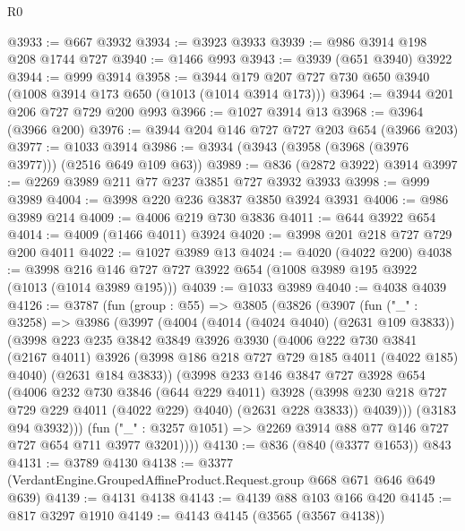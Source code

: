 \begin{lexlean}{R0}
\begin{coremodule}
@3933 := @667 @3932
@3934 := @3923 @3933
@3939 := @986 @3914 @198 @208 @1744 @727
@3940 := @1466 @993
@3943 := @3939 (@651 @3940) @3922
@3944 := @999 @3914
@3958 := @3944 @179 @207 @727 @730 @650 @3940 (@1008 @3914 @173 @650 (@1013 (@1014 @3914 @173)))
@3964 := @3944 @201 @206 @727 @729 @200 @993
@3966 := @1027 @3914 @13
@3968 := @3964 (@3966 @200)
@3976 := @3944 @204 @146 @727 @727 @203 @654 (@3966 @203)
@3977 := @1033 @3914
@3986 := @3934 (@3943 (@3958 (@3968 (@3976 @3977))) (@2516 @649 @109 @63))
@3989 := @836 (@2872 @3922) @3914
@3997 := @2269 @3989 @211 @77 @237 @3851 @727 @3932 @3933
@3998 := @999 @3989
@4004 := @3998 @220 @236 @3837 @3850 @3924 @3931
@4006 := @986 @3989 @214
@4009 := @4006 @219 @730 @3836
@4011 := @644 @3922 @654
@4014 := @4009 (@1466 @4011) @3924
@4020 := @3998 @201 @218 @727 @729 @200 @4011
@4022 := @1027 @3989 @13
@4024 := @4020 (@4022 @200)
@4038 := @3998 @216 @146 @727 @727 @3922 @654 (@1008 @3989 @195 @3922 (@1013 (@1014 @3989 @195)))
@4039 := @1033 @3989
@4040 := @4038 @4039
@4126 := @3787
    (fun (group : @55) =>
    @3805
      (@3826
        (@3907
          (fun ("_" : @3258) =>
          @3986
            (@3997
              (@4004
                (@4014 (@4024 @4040) (@2631 @109 @3833))
                (@3998
                  @223
                  @235
                  @3842
                  @3849
                  @3926
                  @3930
                  (@4006
                    @222
                    @730
                    @3841
                    (@2167 @4011)
                    @3926
                    (@3998 @186 @218 @727 @729 @185 @4011 (@4022 @185) @4040)
                    (@2631 @184 @3833))
                  (@3998
                    @233
                    @146
                    @3847
                    @727
                    @3928
                    @654
                    (@4006
                      @232
                      @730
                      @3846
                      (@644 @229 @4011)
                      @3928
                      (@3998 @230 @218 @727 @729 @229 @4011 (@4022 @229) @4040)
                      (@2631 @228 @3833))
                    @4039)))
              (@3183 @94 @3932)))
          (fun ("_" : @3257 @1051) => @2269 @3914 @88 @77 @146 @727 @727 @654 @711 @3977 @3201))))
@4130 := @836 (@840 (@3377 @1653)) @843
@4131 := @3789 @4130
@4138 := @3377 (VerdantEngine.GroupedAffineProduct.Request.group @668 @671 @646 @649 @639)
@4139 := @4131 @4138
@4143 := @4139 @88 @103 @166 @420
@4145 := @817 @3297 @1910
@4149 := @4143 @4145 (@3565 (@3567 @4138))

\end{coremodule}
\end{lexlean}
